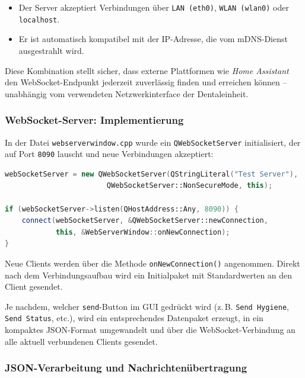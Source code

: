\begin{itemize}
  \item Der Server akzeptiert Verbindungen über \texttt{LAN (eth0)}, \texttt{WLAN (wlan0)} oder \texttt{localhost}.\\
  \item Er ist automatisch kompatibel mit der IP-Adresse, die vom mDNS-Dienst ausgestrahlt wird.
\end{itemize}

Diese Kombination stellt sicher, dass externe Plattformen wie \textit{Home Assistant} den WebSocket-Endpunkt jederzeit zuverlässig finden und erreichen können – unabhängig vom verwendeten Netzwerkinterface der Dentaleinheit.



\subsubsection{WebSocket-Server: Implementierung}

In der Datei \texttt{webserverwindow.cpp} wurde ein \texttt{QWebSocketServer} initialisiert, der auf Port \texttt{8090} lauscht und neue Verbindungen akzeptiert:

\begin{lstlisting}[language=c++,caption={Initialisierung des WebSocket-Servers},label={lst:websocket-server}]
webSocketServer = new QWebSocketServer(QStringLiteral("Test Server"),
                        QWebSocketServer::NonSecureMode, this);

if (webSocketServer->listen(QHostAddress::Any, 8090)) {
    connect(webSocketServer, &QWebSocketServer::newConnection,
            this, &WebServerWindow::onNewConnection);
}
\end{lstlisting}

Neue Clients werden über die Methode \texttt{onNewConnection()} angenommen. Direkt nach dem Verbindungsaufbau wird ein Initialpaket mit Standardwerten an den Client gesendet.

Je nachdem, welcher \texttt{send}-Button im GUI gedrückt wird (z.\,B. \texttt{Send Hygiene}, \texttt{Send Status}, etc.), wird ein entsprechendes Datenpaket erzeugt, in ein kompaktes JSON-Format umgewandelt und über die WebSocket-Verbindung an alle aktuell verbundenen Clients gesendet.

\vspace{1em}
\subsubsection{JSON-Verarbeitung und Nachrichtenübertragung}

